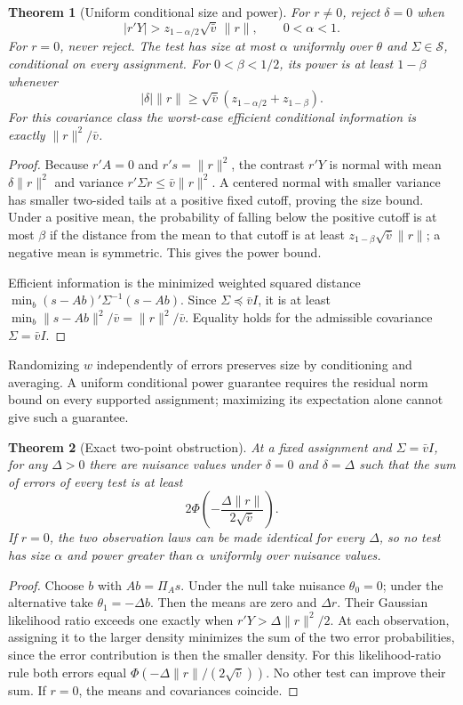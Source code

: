 \documentclass[11pt]{article}
\newtheorem{theorem}{Theorem}
\theoremstyle{remark}\newtheorem{remark}[theorem]{Remark}
\begin{document}
\begin{theorem}[Uniform conditional size and power]
For $r\ne0$, reject $\delta=0$ when
\[
 |r'Y|>z_{1-\alpha/2}\sqrt{\bar v}\,\|r\|,
 \qquad 0<\alpha<1.
\]
For $r=0$, never reject. The test has size at most $\alpha$ uniformly over $\theta$ and $\Sigma\in\mathcal S$, conditional on every assignment. For $0<\beta<1/2$, its power is at least $1-\beta$ whenever
\[
 |\delta|\|r\|\ge\sqrt{\bar v}
 (z_{1-\alpha/2}+z_{1-\beta}).
\]
For this covariance class the worst-case efficient conditional information is exactly $\|r\|^2/\bar v$.
\end{theorem}
\begin{proof}
Because $r'A=0$ and $r's=\|r\|^2$, the contrast $r'Y$ is normal with mean $\delta\|r\|^2$ and variance $r'\Sigma r\le\bar v\|r\|^2$. A centered normal with smaller variance has smaller two-sided tails at a positive fixed cutoff, proving the size bound. Under a positive mean, the probability of falling below the positive cutoff is at most $\beta$ if the distance from the mean to that cutoff is at least $z_{1-\beta}\sqrt{\bar v}\|r\|$; a negative mean is symmetric. This gives the power bound.

Efficient information is the minimized weighted squared distance
$\min_b(s-Ab)'\Sigma^{-1}(s-Ab)$. Since $\Sigma\preceq\bar v I$, it is at least $\min_b\|s-Ab\|^2/\bar v=\|r\|^2/\bar v$. Equality holds for the admissible covariance $\Sigma=\bar v I$.
\end{proof}

Randomizing $w$ independently of errors preserves size by conditioning and averaging. A uniform conditional power guarantee requires the residual norm bound on every supported assignment; maximizing its expectation alone cannot give such a guarantee.

\begin{theorem}[Exact two-point obstruction]
At a fixed assignment and $\Sigma=\bar v I$, for any $\Delta>0$ there are nuisance values under $\delta=0$ and $\delta=\Delta$ such that the sum of errors of every test is at least
\[
 2\Phi\left(-\frac{\Delta\|r\|}{2\sqrt{\bar v}}\right).
\]
If $r=0$, the two observation laws can be made identical for every $\Delta$, so no test has size $\alpha$ and power greater than $\alpha$ uniformly over nuisance values.
\end{theorem}
\begin{proof}
Choose $b$ with $Ab=\Pi_A s$. Under the null take nuisance $\theta_0=0$; under the alternative take $\theta_1=-\Delta b$. Then the means are zero and $\Delta r$. Their Gaussian likelihood ratio exceeds one exactly when $r'Y>\Delta\|r\|^2/2$. At each observation, assigning it to the larger density minimizes the sum of the two error probabilities, since the error contribution is then the smaller density. For this likelihood-ratio rule both errors equal $\Phi(-\Delta\|r\|/(2\sqrt{\bar v}))$. No other test can improve their sum. If $r=0$, the means and covariances coincide.
\end{proof}
\end{document}
